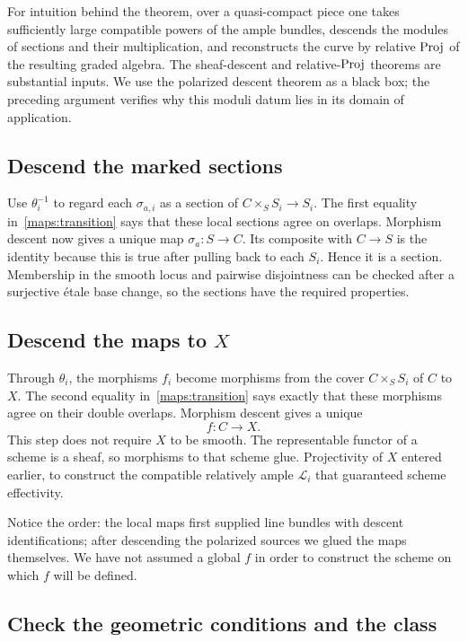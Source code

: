 For intuition behind the theorem, over a quasi-compact piece one takes sufficiently large compatible powers of the ample bundles, descends the modules of sections and their multiplication, and reconstructs the curve by relative $\operatorname{Proj}$ of the resulting graded algebra. The sheaf-descent and relative-$\operatorname{Proj}$ theorems are substantial inputs. We use the polarized descent theorem as a black box; the preceding argument verifies why this moduli datum lies in its domain of application.

\subsection{Descend the marked sections}

Use $\theta_i^{-1}$ to regard each $\sigma_{a,i}$ as a section of $C\times_S S_i\to S_i$. The first equality in~\eqref{maps:transition} says that these local sections agree on overlaps. Morphism descent now gives a unique map $\sigma_a:S\to C$. Its composite with $C\to S$ is the identity because this is true after pulling back to each $S_i$. Hence it is a section. Membership in the smooth locus and pairwise disjointness can be checked after a surjective \'etale base change, so the sections have the required properties.

\subsection{Descend the maps to $X$}

Through $\theta_i$, the morphisms $f_i$ become morphisms from the cover $C\times_S S_i$ of $C$ to $X$. The second equality in~\eqref{maps:transition} says exactly that these morphisms agree on their double overlaps. Morphism descent gives a unique
\[
 f:C\longrightarrow X.
\]
This step does not require $X$ to be smooth. The representable functor of a scheme is a sheaf, so morphisms to that scheme glue. Projectivity of $X$ entered earlier, to construct the compatible relatively ample $\mathcal L_i$ that guaranteed scheme effectivity.

Notice the order: the local maps first supplied line bundles with descent identifications; after descending the polarized sources we glued the maps themselves. We have not assumed a global $f$ in order to construct the scheme on which $f$ will be defined.

\subsection{Check the geometric conditions and the class}

